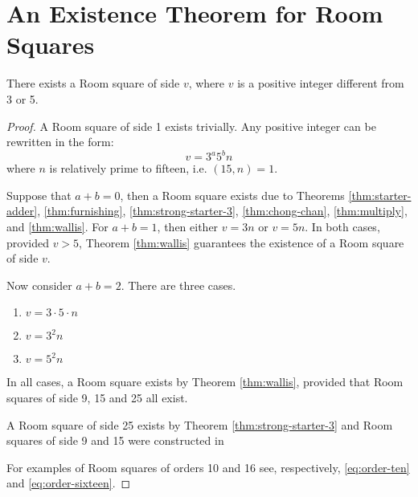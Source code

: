 \chapter{An Existence Theorem for Room Squares}
\label{ch:existence-theorem}

\begin{theorem}
There exists a Room square of side $v$, where $v$ is a positive integer different from 3 or 5.
\end{theorem}

\begin{proof}
A Room square of side 1 exists trivially.
Any positive integer can be rewritten in the form:
\begin{equation}
v = 3^{a}5^{b}n
\end{equation}
where $n$ is relatively prime to fifteen, i.e. $(15, n) = 1$.

Suppose that $a + b = 0$, then a Room square exists due to Theorems
\ref{thm:starter-adder},
\ref{thm:furnishing},
\ref{thm:strong-starter-3},
\ref{thm:chong-chan},
\ref{thm:multiply},
and
\ref{thm:wallis}.
For $a + b = 1$, then either $v = 3n$ or $v = 5n$.
In both cases, provided $v > 5$, Theorem \ref{thm:wallis} guarantees the existence of a Room square of side $v$.

Now consider $a + b = 2$.
There are three cases.

\begin{enumerate}
  \item{$v = 3\cdot 5\cdot n$}
  \item{$v = 3^{2}n$}
  \item{$v = 5^{2}n$}
\end{enumerate}

In all cases, a Room square exists by Theorem \ref{thm:wallis}, provided that Room squares of side 9, 15 and 25 all exist.

A Room square of side 25 exists by Theorem \ref{thm:strong-starter-3} and Room squares of side 9 and 15 were constructed in
\cite{mullinFurnishingRoomSquares1969}

For examples of Room squares of orders 10 and 16 see, respectively, \eqref{eq:order-ten} and \eqref{eq:order-sixteen}.


\end{proof}
